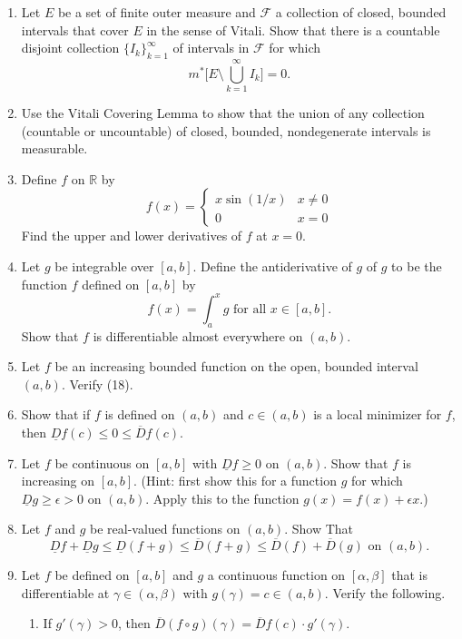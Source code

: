 \begin{enumerate}
    \item Let $E$ be a set of finite outer measure and $\mathcal{F}$ a collection of closed, bounded intervals that cover $E$ in the sense of Vitali.
    Show that there is a countable disjoint collection $\{I_k\}_{k=1}^\infty$ of intervals in $\mathcal{F}$ for which
    \[
        m^*\biggl[E\setminus\bigcup_{k=1}^\infty I_k\biggr]=0.    
    \]
    \item Use the Vitali Covering Lemma to show that the union of any collection (countable or uncountable) of closed, bounded, nondegenerate intervals is measurable.
    \item Define $f$ on $\mathbb{R}$ by
    \[
        f(x)=
        \begin{cases}
            x\sin(1/x)&x\neq0\\
            0&x=0
        \end{cases}    
    \]
    Find the upper and lower derivatives of $f$ at $x=0$.
    \item Let $g$ be integrable over $[a,b]$. Define the antiderivative of $g$ of $g$ to be the function $f$ defined on $[a,b]$ by
    \[
        f(x)=\int_a^xg\text{ for all }x\in[a,b].    
    \]
    Show that $f$ is differentiable almost everywhere on $(a,b)$.
    \item Let $f$ be an increasing bounded function on the open, bounded interval $(a,b)$. Verify (18).
    \item Show that if $f$ is defined on $(a,b)$ and $c\in(a,b)$ is a local minimizer for $f$, then $\underline{D}f(c)\le0\le\overline{D}f(c)$.
    \item Let $f$ be continuous on $[a,b]$ with $\underline{D}f\ge0$ on $(a,b)$. Show that $f$ is increasing on $[a,b]$.
    (Hint: first show this for a function $g$ for which $\underline{D}g\ge\epsilon>0$ on $(a,b)$. Apply this to the function $g(x)=f(x)+\epsilon x$.)
    \item Let $f$ and $g$ be real-valued functions on $(a,b)$. Show That
    \[
        \underline{D}f+\underline{D}g\le\underline{D}(f+g)\le\overline{D}(f+g)\le \overline{D}(f)+\overline{D}(g)\text{ on }(a,b).
    \]
    \item Let $f$ be defined on $[a,b]$ and $g$ a continuous function on $[\alpha,\beta]$ that is differentiable at $\gamma\in(\alpha,\beta)$ with $g(\gamma)=c\in(a,b)$. Verify the following.
    \begin{enumerate}[label=(\roman*),align=left]
        \item If $g'(\gamma)>0$, then $\overline{D}(f\circ g)(\gamma)=\overline{D}f(c)\cdot g'(\gamma)$.

\end{enumerate}
\end{enumerate}

